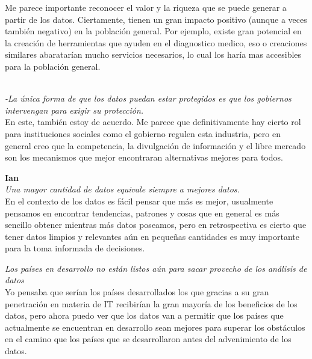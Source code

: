 \documentclass[12pt,a4paper]{article}
\begin{document}
\begin{enumerate}
\begin{enumerate}
				Me parece importante reconocer el valor y la riqueza que se puede generar a partir de los datos. Ciertamente, tienen un gran impacto positivo (aunque a veces también negativo) en la población general.
Por ejemplo, existe gran potencial en la creación de herramientas que ayuden en el diagnostico medico, eso o creaciones similares abaratarían mucho servicios necesarios, lo cual los haría mas accesibles para la población general.

\\

				\textit {-La única forma de que los datos puedan estar
protegidos es que los gobiernos intervengan
para exigir su protección.} \\

			En este, también estoy de acuerdo. Me parece que definitivamente hay cierto rol para instituciones sociales como el gobierno regulen esta industria, pero en general creo que la competencia, la divulgación de información y el libre mercado son los mecanismos que mejor encontraran alternativas mejores para todos.

				\textbf{Ian}\\
				\textit {Una mayor cantidad de datos equivale siempre a mejores datos.} \\

				En el contexto de los datos es fácil pensar que más es mejor, usualmente
				pensamos en encontrar tendencias, patrones y cosas que en general
				es más sencillo obtener mientras más datos poseamos, pero en retrospectiva
				es cierto que tener datos limpios y relevantes aún en pequeñas cantidades
				es muy importante para la toma informada de decisiones.

				\textit {Los países en desarrollo no están listos aún para sacar provecho de los análisis de datos} \\

				Yo pensaba que serían los países desarrollados los que gracias a
				su gran penetración en materia de IT recibirían la gran mayoría
				de los beneficios de los datos, pero ahora puedo ver que los datos
				van a permitir que los países que actualmente se encuentran en desarrollo
				sean mejores para superar los obstáculos en el camino que los países
				que se desarrollaron antes del advenimiento de los datos.	
				
		\end{enumerate}

\end{enumerate}
\end{document}
